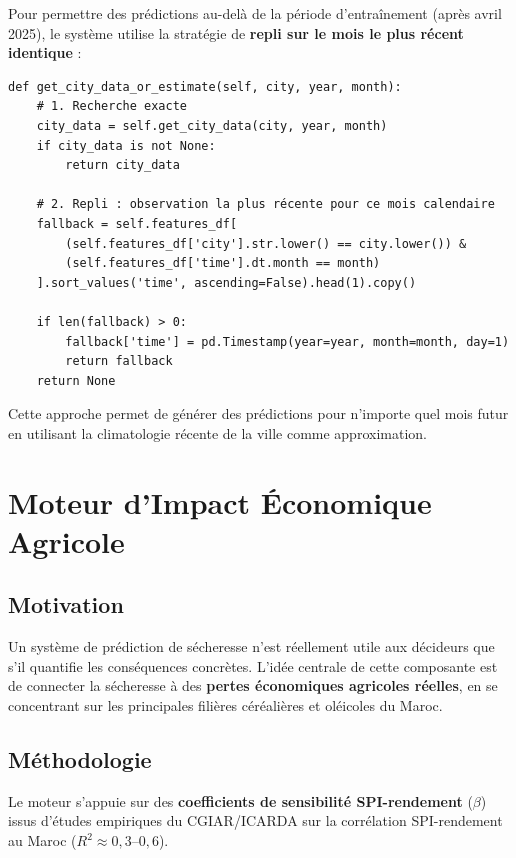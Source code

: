 \documentclass[12pt,a4paper]{report}
\begin{document}
Pour permettre des prédictions au-delà de la période d'entraînement (après avril 2025), le système utilise la stratégie de \textbf{repli sur le mois le plus récent identique} :

\begin{lstlisting}[style=pythonStyle, caption={Repli sur données historiques pour dates futures}]
def get_city_data_or_estimate(self, city, year, month):
    # 1. Recherche exacte
    city_data = self.get_city_data(city, year, month)
    if city_data is not None:
        return city_data

    # 2. Repli : observation la plus récente pour ce mois calendaire
    fallback = self.features_df[
        (self.features_df['city'].str.lower() == city.lower()) &
        (self.features_df['time'].dt.month == month)
    ].sort_values('time', ascending=False).head(1).copy()

    if len(fallback) > 0:
        fallback['time'] = pd.Timestamp(year=year, month=month, day=1)
        return fallback
    return None
\end{lstlisting}

Cette approche permet de générer des prédictions pour n'importe quel mois futur en utilisant la climatologie récente de la ville comme approximation.

\chapter{Moteur d'Impact Économique Agricole}

\section{Motivation}

Un système de prédiction de sécheresse n'est réellement utile aux décideurs que s'il quantifie les conséquences concrètes. L'idée centrale de cette composante est de connecter la sécheresse à des \textbf{pertes économiques agricoles réelles}, en se concentrant sur les principales filières céréalières et oléicoles du Maroc.

\section{Méthodologie}

Le moteur s'appuie sur des \textbf{coefficients de sensibilité SPI-rendement} ($\beta$) issus d'études empiriques du CGIAR/ICARDA sur la corrélation SPI-rendement au Maroc ($R^2 \approx 0{,}3$--$0{,}6$).
\end{document}
